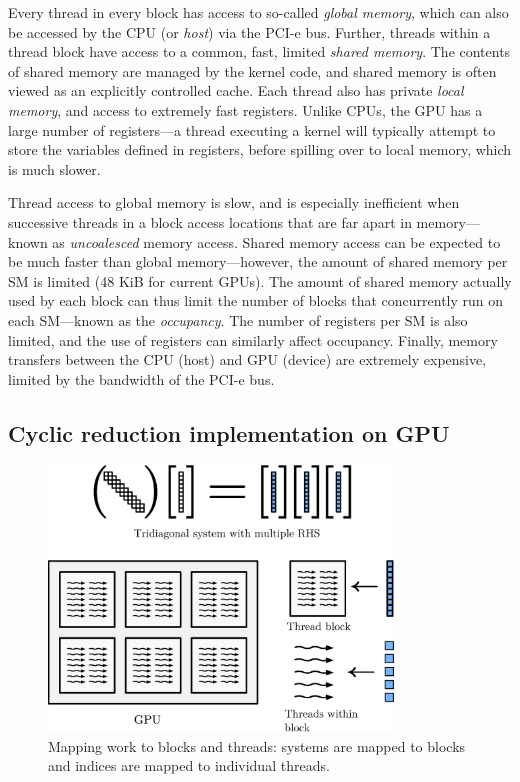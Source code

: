 \documentclass{elsarticle}
\begin{document}
Every thread in every block has access to so-called \emph{global memory},
which can also be accessed by the CPU (or \emph{host}) via the PCI-e bus.
Further,
threads within a thread block have access
to a common, fast, limited \emph{shared memory}.
The contents of shared memory are managed by the kernel code,
and shared memory is often viewed as an explicitly controlled cache.
Each thread also has private \emph{local memory},
and access to extremely fast registers.
Unlike CPUs, the GPU has a large number of registers---a
thread executing a kernel will
typically attempt to store the variables defined in registers,
before spilling over to local memory, which is much slower.

Thread access to global memory is slow,
and is especially inefficient when
successive threads in a block
access locations that are far apart in memory---known
as \emph{uncoalesced} memory access.
Shared memory access can be expected to be
much faster than global memory---however,
the amount of shared memory per SM is limited
(48 KiB for current GPUs).
The amount of shared memory actually used by each block
can thus limit the number of blocks that
concurrently run on each SM---known as the \emph{occupancy}.
The number of registers per SM is also limited,
and the use of registers can similarly affect occupancy.
Finally, memory transfers between the CPU (host) and GPU (device)
are extremely expensive, limited by the bandwidth of the PCI-e bus.

\subsection{Cyclic reduction implementation on GPU}

\begin{figure}
\begin{center}
\includegraphics[height=200pt]{img/gpu-mapping.eps}
\end{center}
\caption{Mapping work to blocks and threads:
systems are mapped to blocks and
indices are mapped to individual threads.}
\label{fig:gpu-mapping}
\end{figure}
\end{document}
